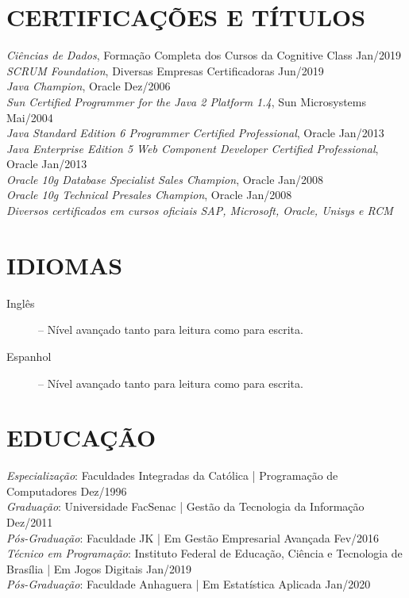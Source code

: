\documentclass{res}
\begin{document}
\begin{resume}
		\section{CERTIFICAÇÕES E TÍTULOS}
		\vspace{8pt}
		{\sl Ciências de Dados}, Formação Completa dos Cursos da Cognitive Class \hfill Jan/2019 \\
		{\sl SCRUM Foundation}, Diversas Empresas Certificadoras \hfill Jun/2019 \\
		{\sl Java Champion}, Oracle \hfill Dez/2006 \\
		{\sl Sun Certified Programmer for the Java 2 Platform 1.4}, Sun Microsystems \hfill Mai/2004 \\
		{\sl Java Standard Edition 6 Programmer Certified Professional}, Oracle \hfill Jan/2013 \\
		{\sl Java Enterprise Edition 5 Web Component Developer Certified Professional}, Oracle \hfill Jan/2013 \\
		{\sl Oracle 10g Database Specialist Sales Champion}, Oracle \hfill Jan/2008 \\
		{\sl Oracle 10g Technical Presales Champion}, Oracle \hfill Jan/2008 \\
		{\sl Diversos certificados em cursos oficiais SAP, Microsoft, Oracle, Unisys e RCM}
		
		\section{IDIOMAS} 
		\vspace{18pt}
		\begin{description}
			\item[Inglês] -- Nível avançado tanto para leitura como para escrita.
			\item[Espanhol] -- Nível avançado tanto para leitura como para escrita.
		\end{description}
		
		\section{EDUCAÇÃO}
		\vspace{8pt} 
		{\sl Especialização}: Faculdades Integradas da Católica | Programação de Computadores 
		\hfill Dez/1996 \\
		{\sl Graduação}: Universidade FacSenac | Gestão da Tecnologia da Informação     
		\hfill Dez/2011 \\
		{\sl Pós-Graduação}: Faculdade JK | Em Gestão Empresarial Avançada 
		\hfill Fev/2016 \\
		{\sl Técnico em Programação}: Instituto Federal de Educação, Ciência e Tecnologia de Brasília | Em Jogos Digitais
		\hfill Jan/2019 \\
		{\sl Pós-Graduação}: Faculdade Anhaguera | Em Estatística Aplicada
		\hfill Jan/2020 \\
		

\end{resume}
\end{document}
